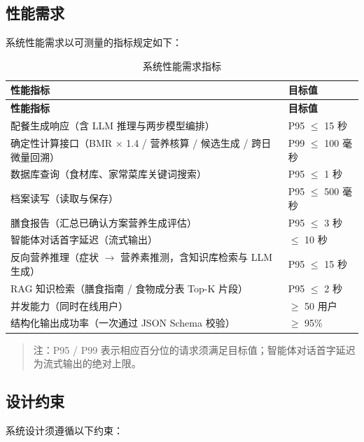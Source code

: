 \documentclass[12pt,a4paper]{ctexart}
\begin{document}
\subsection{性能需求}\label{sec:performance}

系统性能需求以可测量的指标规定如下：

\begin{xltabular}{\linewidth}{Lp{4.5cm}}
\caption{系统性能需求指标} \\
\toprule
\textbf{性能指标} & \textbf{目标值} \\
\midrule
\endfirsthead
\toprule
\textbf{性能指标} & \textbf{目标值} \\
\midrule
\endhead
配餐生成响应（含 LLM 推理与两步模型编排） & P95 $\leq$ 15 秒 \\
确定性计算接口（BMR $\times$ 1.4 / 营养核算 / 候选生成 / 跨日微量回溯） & P99 $\leq$ 100 毫秒 \\
数据库查询（食材库、家常菜库关键词搜索） & P95 $\leq$ 1 秒 \\
档案读写（读取与保存） & P95 $\leq$ 500 毫秒 \\
膳食报告（汇总已确认方案营养生成评估） & P95 $\leq$ 3 秒 \\
智能体对话首字延迟（流式输出） & $\leq$ 10 秒 \\
反向营养推理（症状 $\rightarrow$ 营养素推测，含知识库检索与 LLM 生成） & P95 $\leq$ 15 秒 \\
RAG 知识检索（膳食指南 / 食物成分表 Top-K 片段） & P95 $\leq$ 2 秒 \\
并发能力（同时在线用户） & $\geq$ 50 用户 \\
结构化输出成功率（一次通过 JSON Schema 校验） & $\geq$ 95\% \\
\bottomrule
\end{xltabular}

\begin{quote}
注：P95 / P99 表示相应百分位的请求须满足目标值；智能体对话首字延迟为流式输出的绝对上限。
\end{quote}

\subsection{设计约束}\label{sec:design-constraints}

系统设计须遵循以下约束：
\end{document}

